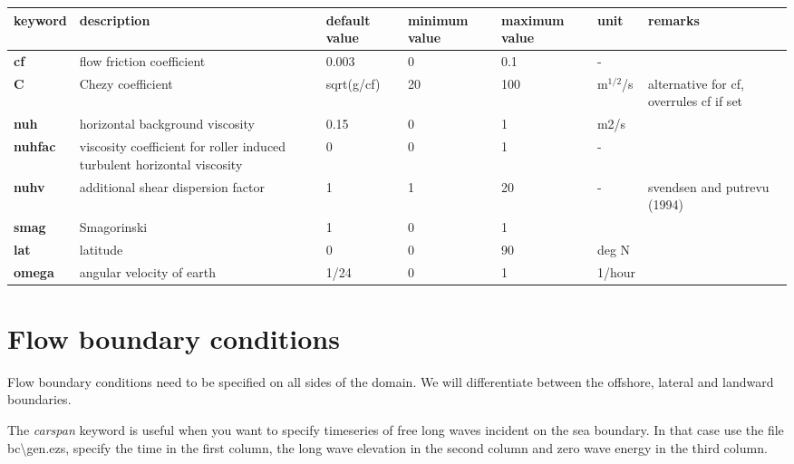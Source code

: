 \begin{tabular}{|p{0.5in}|p{0.8in}|p{0.5in}|p{0.5in}|p{0.5in}|p{0.4in}|p{0.6in}|} \hline 
keyword & description & default value & minimum value & maximum value & unit & remarks \\ \hline 
\textbf{cf      } & flow friction coefficient & 0.003 & 0 & 0.1 & - &  \\ \hline 
\textbf{C       } & Chezy coefficient & sqrt(g/cf)  & 20 & 100 & m${}^{1/2}$/s & alternative for cf, overrules cf if set \\ \hline 
\textbf{nuh     } & horizontal background viscosity & 0.15 & 0 & 1 & m2/s &  \\ \hline 
\textbf{nuhfac  } & viscosity coefficient for roller induced turbulent horizontal viscosity & 0 & 0 & 1 & - &  \\ \hline 
\textbf{nuhv    } & additional shear dispersion factor & 1 & 1 & 20 & - & svendsen and putrevu (1994) \\ \hline 
\textbf{smag} & Smagorinski & 1 & 0 & 1 &  &  \\ \hline 
\textbf{lat     } & latitude & 0 & 0 & 90 & deg N &  \\ \hline 
\textbf{omega} & angular velocity of earth  & 1/24 & 0 & 1 & 1/hour &  \\ \hline 
\end{tabular}
\section{Flow boundary conditions}

Flow boundary conditions need to be specified on all sides of the domain. We will differentiate between the offshore, lateral and landward boundaries. 

The \textit{carspan} keyword is useful when you want to specify timeseries of free long waves incident on the sea boundary. In that case use the file bc\textbackslash gen.ezs, specify the time in the first column, the long wave elevation in the second column and zero wave energy in the third column.

